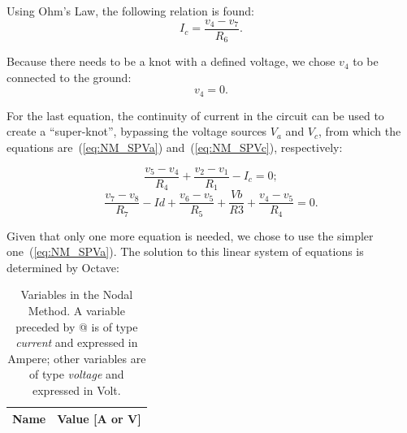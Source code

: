 Using Ohm’s Law, the following relation is found:
\begin{equation}
  I_c = \frac{v_4-v_7}{R_6}.
  \label{eq:NM_OhmIc}
\end{equation}

Because there needs to be a knot with a defined voltage, we chose $v_4$ to be connected to the ground:
\begin{equation}
  v_4 = 0.
  \label{eq:NM_v4=0}
\end{equation}

For the last equation, the continuity of current in the circuit can be used to create a “super-knot”, bypassing the voltage sources $V_a$ and $V_c$, from which the equations are~(\ref{eq:NM_SPVa}) and~(\ref{eq:NM_SPVc}), respectively:

\begin{equation}
  \frac{v_5-v_4}{R_4} + \frac{v_2-v_1}{R_1} - I_c = 0;
  \label{eq:NM_SPVa}
\end{equation}
\begin{equation}
  \frac{v_7-v_8}{R_7} - Id + \frac{v_6-v_5}{R_5} + \frac{Vb}{R3} + \frac{v_4-v_5}{R_4} = 0.
  \label{eq:NM_SPVc}
\end{equation}

Given that only one more equation is needed, we chose to use the simpler one~(\ref{eq:NM_SPVa}).
The solution to this linear system of equations is determined by Octave:

\begin{table}[h]
  \centering
  \begin{tabular}{|l|r|}
  \hline  
    {\bf Name} & {\bf Value [A or V]} \\ \hline
    
  \end{tabular}
  \caption{Variables in the Nodal Method. A variable preceded by @ is of type {\em current} and expressed in Ampere; other variables are of type {\em voltage} and expressed in Volt.}
  \label{tab:nos}
\end{table}

